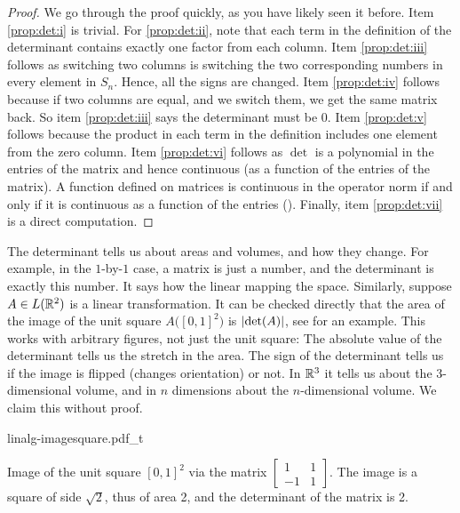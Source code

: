 \begin{proof}
We go through the proof quickly, as you have likely seen it before.
%
Item \ref{prop:det:i} is trivial.  For \ref{prop:det:ii}, note that each term in the definition of the
determinant contains exactly one factor from each column.
%
Item \ref{prop:det:iii} follows as switching two columns is switching the
two corresponding numbers in every element in $S_n$.  Hence, all the signs
are changed.
Item \ref{prop:det:iv} follows because if two columns are equal, and we
switch them, we get
the same matrix back.  So item \ref{prop:det:iii} says the determinant must be 0.
%
Item \ref{prop:det:v} follows because the product in each term in the definition includes
one element from the zero column.
Item \ref{prop:det:vi} follows as $\det$ is a polynomial in the entries of the matrix
and hence continuous (as a function of the entries of the matrix).
A function defined on
matrices is continuous in the operator norm if and only if it is 
continuous as a function of the entries ().
Finally, item \ref{prop:det:vii} is a direct computation.
\end{proof}

The determinant tells us about areas and volumes, and how they change.
For example, in the $1$-by-$1$ case, a matrix is just a number, and the
determinant is exactly this number.  It says how the linear mapping
 the space.  Similarly,
suppose $A \in L({\mathbb{R}}^2)$ is a linear transformation.
It can be checked directly that
the area of the image of the unit square $A\bigl([0,1]^2\bigr)$ is
$\lvert {\det(A)} \rvert$, see  for an example.
This works with arbitrary figures, not just the unit
square:
The absolute value of the determinant tells us the stretch in the area.
The sign of the determinant tells us if the image is
flipped (changes orientation) or not.
In ${\mathbb{R}}^3$ it
tells us about the 3-dimensional volume, and in $n$ dimensions about the
$n$-dimensional volume.  We claim this without proof.
\begin{myfigureht}
{linalg-imagesquare.pdf_t}
\caption{Image of the unit square ${[0,1]}^2$ via the matrix
$\left[\begin{smallmatrix}1 & 1 \\ -1 & 1\end{smallmatrix}\right]$.
The image is a square of side $\sqrt{2}$, thus of area 2, and the determinant of the
matrix is 2.\label{fig:imagesquare}}
\end{myfigureht}

